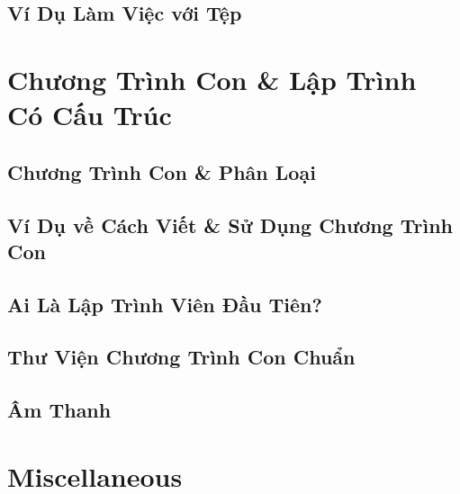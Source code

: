\documentclass[oneside]{book}
\numberwithin{equation}{section}
\begin{document}

\section{Ví Dụ Làm Việc với Tệp}


\chapter{Chương Trình Con \& Lập Trình Có Cấu Trúc}

\section{Chương Trình Con \& Phân Loại}


\section{Ví Dụ về Cách Viết \& Sử Dụng Chương Trình Con}


\section{Ai Là Lập Trình Viên Đầu Tiên?}


\section{Thư Viện Chương Trình Con Chuẩn}


\section{Âm Thanh}


\appendix

\chapter{Miscellaneous}
\end{document}
